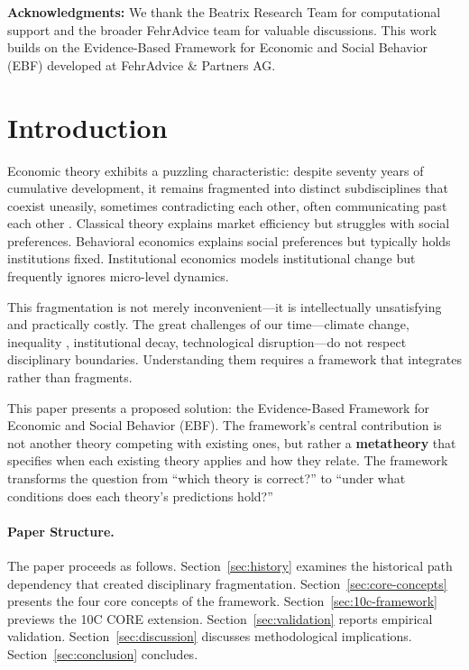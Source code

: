 \documentclass[12pt,a4paper]{article}
\theoremstyle{definition}
\begin{document}
\noindent\textbf{Acknowledgments:} We thank the Beatrix Research Team for computational support and the broader FehrAdvice team for valuable discussions. This work builds on the Evidence-Based Framework for Economic and Social Behavior (EBF) developed at FehrAdvice \& Partners AG.

\newpage
\tableofcontents
\newpage


\section{Introduction}
\label{sec:introduction}

Economic theory exhibits a puzzling characteristic: despite seventy years of cumulative development, it remains fragmented into distinct subdisciplines that coexist uneasily, sometimes contradicting each other, often communicating past each other \citep{colander2004}. Classical theory explains market efficiency but struggles with social preferences. Behavioral economics explains social preferences but typically holds institutions fixed. Institutional economics models institutional change but frequently ignores micro-level dynamics.

This fragmentation is not merely inconvenient---it is intellectually unsatisfying and practically costly. The great challenges of our time---climate change, inequality \citep{piketty2014}, institutional decay, technological disruption---do not respect disciplinary boundaries. Understanding them requires a framework that integrates rather than fragments.

This paper presents a proposed solution: the Evidence-Based Framework for Economic and Social Behavior (EBF). The framework's central contribution is not another theory competing with existing ones, but rather a \textbf{metatheory} that specifies when each existing theory applies and how they relate. The framework transforms the question from ``which theory is correct?'' to ``under what conditions does each theory's predictions hold?''

\paragraph{Paper Structure.}
The paper proceeds as follows. Section~\ref{sec:history} examines the historical path dependency that created disciplinary fragmentation. Section~\ref{sec:core-concepts} presents the four core concepts of the framework. Section~\ref{sec:10c-framework} previews the 10C CORE extension. Section~\ref{sec:validation} reports empirical validation. Section~\ref{sec:discussion} discusses methodological implications. Section~\ref{sec:conclusion} concludes.
\end{document}
